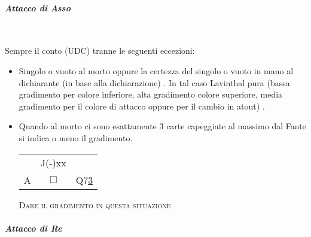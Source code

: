 \documentclass[a4paper,italian]{article}
\newcommand{\cards}[1]{\textsf{#1}}
\newcommand\onesuitenw[3]%
    {%
        \begin{center}%
            \begin{tabular}{>{\hfill}p{3cm}cp{3cm}}%
                & \cards{#2} \\%
                \cards{#1}& $\Box$    & \cards{#3}%
            \end{tabular}%
        \end{center}%
        }
\begin{document}
                                \paragraph{\textit{Attacco di Asso}}\mbox{}\\
                                \vspace{-.4cm}

                                Sempre il conto (UDC) tranne le seguenti eccezioni:

                                \begin{itemize}
                                    \item Singolo o vuoto al morto oppure la certezza del singolo o vuoto in mano al dichiarante
                                        (in base alla dichiarazione) . In tal caso Lavinthal pura (bassa gradimento per colore
                                        inferiore, alta gradimento colore superiore, media gradimento per il colore di attacco
                                        oppure per il cambio in atout) .
                                    \item Quando al morto ci sono esattamente 3 carte capeggiate al massimo dal Fante si indica
                                        o meno il gradimento.
                                        \onesuitenw{A}{J(-)xx}{Q7\underline{3}}
                                        \begin{center}
                                            \textsc{Dare il gradimento in questa situazione}
                                        \end{center}
                                \end{itemize}

                                \paragraph{\textit{Attacco di Re}}\mbox{}\\
                                \vspace{-.4cm}
\end{document}
